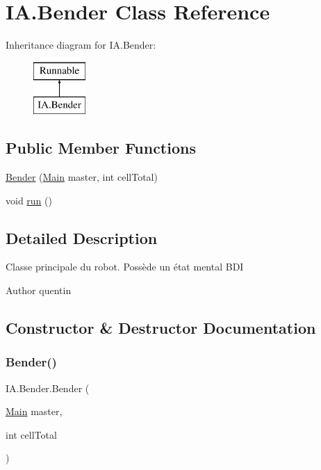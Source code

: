 \hypertarget{class_i_a_1_1_bender}{}\section{I\+A.\+Bender Class Reference}
\label{class_i_a_1_1_bender}
Inheritance diagram for I\+A.\+Bender\+:\begin{figure}[H]
\begin{center}
\leavevmode
\includegraphics[height=2.000000cm]{class_i_a_1_1_bender}
\end{center}
\end{figure}
\subsection*{Public Member Functions}
\begin{DoxyCompactItemize}
\item 
\hyperlink{class_i_a_1_1_bender_ab961bfaa97015eed15f408a22f442766}{Bender} (\hyperlink{classmain_1_1_main}{Main} master, int cell\+Total)
\item 
void \hyperlink{class_i_a_1_1_bender_a39093dae1a9f2b190e32fc5305a46533}{run} ()
\end{DoxyCompactItemize}


\subsection{Detailed Description}
Classe principale du robot. Possède un état mental B\+DI \begin{DoxyAuthor}{Author}
quentin 
\end{DoxyAuthor}


\subsection{Constructor \& Destructor Documentation}
\hypertarget{class_i_a_1_1_bender_ab961bfaa97015eed15f408a22f442766}{}\label{class_i_a_1_1_bender_ab961bfaa97015eed15f408a22f442766} 
\subsubsection{\texorpdfstring{Bender()}{Bender()}}
{\footnotesize\ttfamily I\+A.\+Bender.\+Bender (\begin{DoxyParamCaption}\item[{\hyperlink{classmain_1_1_main}{Main}}]{master,  }\item[{int}]{cell\+Total }\end{DoxyParamCaption})}


